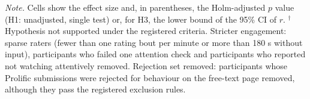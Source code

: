 \begin{table}[tbp]
\begin{threeparttable}
\begin{tabular}{@{}llccc@{}}
\bottomrule
\end{tabular}
\vspace{4pt}
\begin{tablenotes}
{\small\textit{Note.} Cells show the effect size and, in parentheses, the Holm-adjusted $p$ value (H1: unadjusted, single test) or, for H3, the lower bound of the 95\% CI of $r$. $^\dagger$Hypothesis not supported under the registered criteria. Stricter engagement: sparse raters (fewer than one rating bout per minute or more than 180 s without input), participants who failed one attention check and participants who reported not watching attentively removed. Rejection set removed: participants whose Prolific submissions were rejected for behaviour on the free-text page removed, although they pass the registered exclusion rules.}
\end{tablenotes}
\end{threeparttable}
\end{table}
